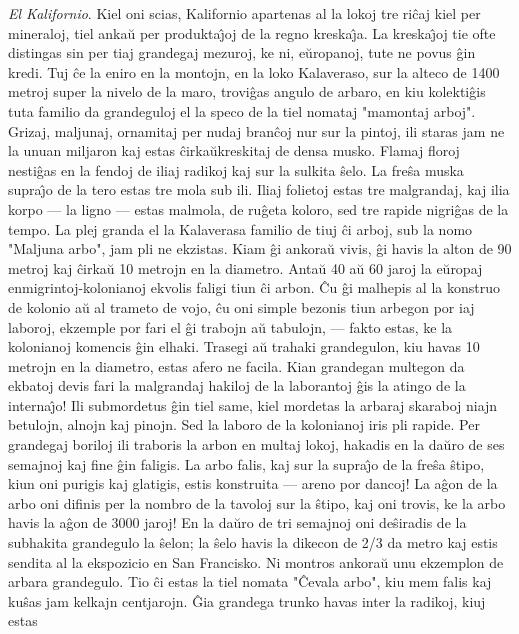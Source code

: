 \emph{El Kalifornio}. Kiel oni scias, Kalifornio apartenas al la
lokoj tre ri\^caj kiel per mineraloj, tiel anka\u u per
produkta\^{\j}oj de la regno kreska\^{\j}a. La kreska\^{\j}oj tie
ofte distingas sin per tiaj grandegaj mezuroj, ke ni, e\u uropanoj,
tute ne povus \^gin kredi. Tuj \^ce la eniro en la montojn, en la
loko Kalaveraso, sur la alteco de 1400 metroj super la nivelo de la
maro, trovi\^gas angulo de arbaro, en kiu kolekti\^gis tuta familio
da grandeguloj el la speco de la tiel nomataj "mamontaj arboj".
Grizaj, maljunaj, ornamitaj per nudaj bran\^coj nur sur la pintoj,
ili staras jam ne la unuan miljaron kaj estas \^cirka\u ukreskitaj
de densa musko. Flamaj floroj nesti\^gas en la fendoj de iliaj
radikoj kaj sur la sulkita \^selo. La fre\^sa muska supra\^{\j}o de
la tero estas tre mola sub ili. Iliaj folietoj estas tre malgrandaj,
kaj ilia korpo --- la ligno --- estas malmola, de ru\^geta koloro,
sed tre rapide nigri\^gas de la tempo. La plej granda el la
Kalaverasa familio de tiuj \^ci arboj, sub la nomo "Maljuna arbo",
jam pli ne ekzistas. Kiam \^gi ankora\u u vivis, \^gi havis la alton
de 90 metroj kaj \^cirka\u u 10 metrojn en la diametro. Anta\u u 40
a\u u 60 jaroj la e\u uropaj enmigrintoj-kolonianoj ekvolis faligi
tiun \^ci arbon. \^Cu \^gi malhepis al la konstruo de kolonio a\u u
al trameto de vojo, \^cu oni simple bezonis tiun arbegon por iaj
laboroj, ekzemple por fari el \^gi trabojn a\u u tabulojn, --- fakto
estas, ke la kolonianoj komencis \^gin elhaki. Trasegi a\u u trahaki
grandegulon, kiu havas 10 metrojn en la diametro, estas afero ne
facila. Kian grandegan multegon da ekbatoj devis fari la malgrandaj
hakiloj de la laborantoj \^gis la atingo de la interna\^{\j}o! Ili
submordetus \^gin tiel same, kiel mordetas la arbaraj skaraboj niajn
betulojn, alnojn kaj pinojn. Sed la laboro de la kolonianoj iris pli
rapide. Per grandegaj boriloj ili traboris la arbon en multaj lokoj,
hakadis en la da\u uro de ses semajnoj kaj fine \^gin faligis. La
arbo falis, kaj sur la supra\^{\j}o de la fre\^sa \^stipo, kiun oni
purigis kaj glatigis, estis konstruita --- areno por dancoj! La
a\^gon de la arbo oni difinis per la nombro de la tavoloj sur la
\^stipo, kaj oni trovis, ke la arbo havis la a\^gon de 3000 jaroj!
En la da\u uro de tri semajnoj oni de\^siradis de la subhakita
grandegulo la \^selon; la \^selo havis la dikecon de 2/3 da metro
kaj estis sendita al la ekspozicio en San Francisko. Ni montros
ankora\u u unu ekzemplon de arbara grandegulo. Tio \^ci estas la
tiel nomata "\^Cevala arbo", kiu mem falis kaj ku\^sas jam kelkajn
centjarojn. \^Gia grandega trunko havas inter la radikoj, kiuj estas
